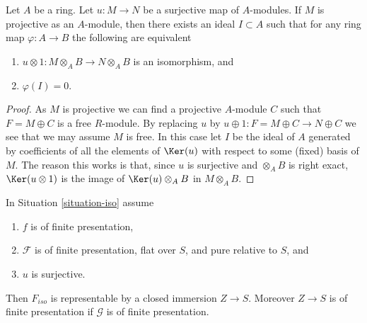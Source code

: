 \begin{lemma}
\label{lemma-flattening-module-map}
Let $A$ be a ring. Let $u : M \to N$ be a surjective map of $A$-modules.
If $M$ is projective as an $A$-module, then there exists an ideal
$I \subset A$ such that for any ring map $\varphi : A \to B$
the following are equivalent
\begin{enumerate}
\item $u \otimes 1 : M \otimes_A B \to N \otimes_A B$ is an
isomorphism, and
\item $\varphi(I) = 0$.
\end{enumerate}
\end{lemma}

\begin{proof}
As $M$ is projective we can find a projective $A$-module $C$
such that $F = M \oplus C$ is a free $R$-module.
By replacing $u$ by $u \oplus 1 : F = M \oplus C \to N \oplus C$
we see that we may assume $M$ is free. In this case let $I$ be
the ideal of $A$ generated by coefficients of all the elements of
$\Ker(u)$ with respect to some (fixed) basis of $M$.
The reason this works is that, since $u$ is surjective and
$\otimes_A B$ is right exact, $\Ker(u \otimes 1)$ is
the image of $\Ker(u) \otimes_A B$ in $M \otimes_A B$.
\end{proof}

\begin{theorem}
\label{theorem-flattening-map}
In
Situation \ref{situation-iso}
assume
\begin{enumerate}
\item $f$ is of finite presentation,
\item $\mathcal{F}$ is of finite presentation, flat over $S$, and
pure relative to $S$, and
\item $u$ is surjective.
\end{enumerate}
Then $F_{iso}$ is representable by a closed immersion $Z \to S$.
Moreover $Z \to S$ is of finite presentation if $\mathcal{G}$ is
of finite presentation.
\end{theorem}

